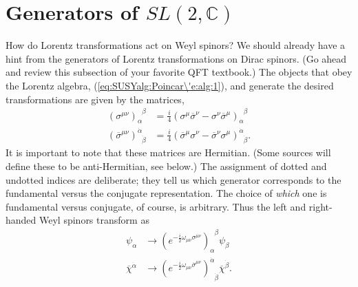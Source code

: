 \section{\texorpdfstring{Generators of $SL(2,\mathbb{C})$}{Generators of SL(2,C)}}


How do Lorentz transformations act on Weyl spinors? We should already have a hint from the generators of Lorentz transformations on Dirac spinors. (Go ahead and review this subsection of your favorite QFT textbook.) The objects that obey the Lorentz algebra,  (\ref{eq:SUSYalg:Poincar\'e:alg:1}), and generate the desired transformations are given by the matrices,
\begin{align}
    (\sigma^{\mu\nu})_\alpha^{\phantom\alpha\beta} &= \frac i4(\sigma^\mu\overline\sigma^\nu-\sigma^\nu\overline\sigma^\mu)_\alpha^{\phantom\alpha\beta}\label{eq:SUSYalg:sigmamunu}\\
    (\overline\sigma^{\mu\nu})^{\dot\alpha}_{\phantom{\dot\alpha}\dot\beta} &= \frac i4 (\overline \sigma^\mu\sigma^\nu - \overline\sigma^\nu\sigma^\mu)^{\dot\alpha}_{\phantom{\dot\alpha}\dot\beta}\label{eq:SUSYalg:sigmabarmunu}.
\end{align}
It is important to note that these matrices are Hermitian. (Some sources will define these to be anti-Hermitian, see below.) The assignment of dotted and undotted indices are deliberate; they tell us which generator corresponds to the fundamental versus the conjugate representation. The choice of \emph{which} one is fundamental versus conjugate, of course, is arbitrary. 
Thus the left and right-handed Weyl spinors transform as
\begin{align}
    \psi_\alpha &\rightarrow \left(e^{-\frac i2 \omega_{\mu\nu}\sigma^{\mu\nu}}\right)_\alpha^{\phantom\alpha\beta}\psi_\beta\label{eq:SUSYalg:alphatransform}\\
    \overline\chi^{\dot\alpha} &\rightarrow \left(e^{-\frac i2 \omega_{\mu\nu}\overline\sigma^{\mu\nu}}\right)^{\dot\alpha}_{\phantom\alpha\dot\beta}\overline\chi^{\dot\beta}.\label{eq:SUSYalg:alphadottransform}
\end{align}


